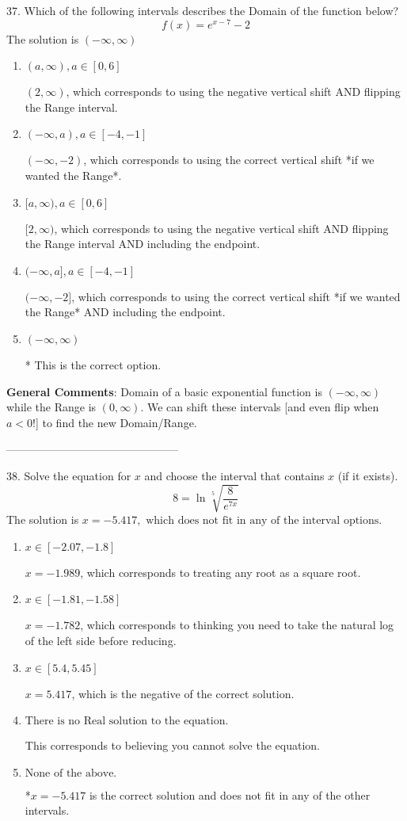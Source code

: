 \documentclass{extbook}[14pt]
\begin{document}
37. Which of the following intervals describes the Domain of the function below?
\[ f(x) = e^{x-7}-2 \] 
The solution is $ (-\infty, \infty) $ 

\begin{enumerate}[label=\Alph*.] 
\item $ (a, \infty), a \in [0, 6] $ 

 $(2, \infty)$, which corresponds to using the negative vertical shift AND flipping the Range interval. 
\item $ (-\infty, a), a \in [-4, -1] $ 

 $(-\infty, -2)$, which corresponds to using the correct vertical shift *if we wanted the Range*. 
\item $ [a, \infty), a \in [0, 6] $ 

 $[2, \infty)$, which corresponds to using the negative vertical shift AND flipping the Range interval AND including the endpoint. 
\item $ (-\infty, a], a \in [-4, -1] $ 

 $(-\infty, -2]$, which corresponds to using the correct vertical shift *if we wanted the Range* AND including the endpoint. 
\item $ (-\infty, \infty) $ 

 * This is the correct option. 
\end{enumerate} 
 
\textbf{General Comments}: Domain of a basic exponential function is $(-\infty, \infty)$ while the Range is $(0, \infty)$. We can shift these intervals [and even flip when $a<0$!] to find the new Domain/Range.

-----------------------------------------------

38.  Solve the equation for $x$ and choose the interval that contains $x$ (if it exists).
\[  8 = \ln{\sqrt[5]{\frac{8}{e^{7x}}}} \] 
The solution is $ x = -5.417, \text{ which does not fit in any of the interval options.} $ 

\begin{enumerate}[label=\Alph*.] 
\item $ x \in [-2.07, -1.8] $ 

 $x = -1.989$, which corresponds to treating any root as a square root. 
\item $ x \in [-1.81, -1.58] $ 

 $x = -1.782$, which corresponds to thinking you need to take the natural log of the left side before reducing. 
\item $ x \in [5.4, 5.45] $ 

 $x = 5.417$, which is the negative of the correct solution. 
\item $ \text{There is no Real solution to the equation.} $ 

 This corresponds to believing you cannot solve the equation. 
\item $ \text{None of the above.} $ 

 *$x = -5.417$ is the correct solution and does not fit in any of the other intervals. 
\end{enumerate} 
 
\end{document}
